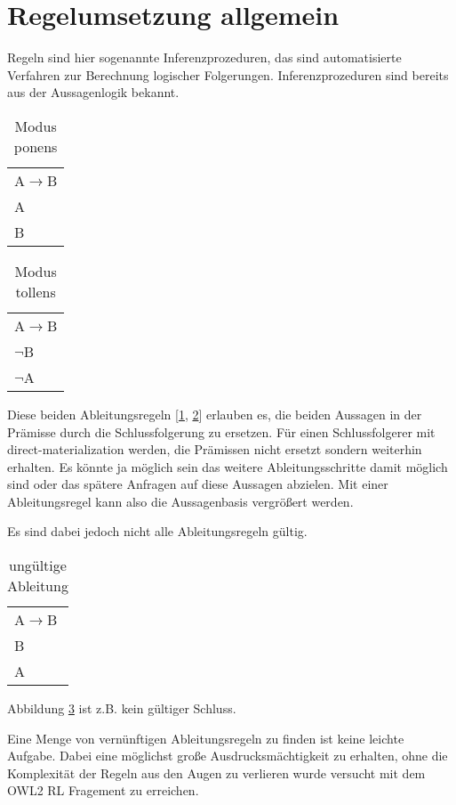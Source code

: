 \section{Regelumsetzung allgemein}
\label{abschnitt-regelumsetzung}
Regeln sind hier sogenannte Inferenzprozeduren, das sind automatisierte Verfahren zur Berechnung logischer Folgerungen. Inferenzprozeduren sind bereits aus der Aussagenlogik bekannt.

\begin{table}[htb]
\begin{center}
	\begin{tabular}{l}
	A$\rightarrow$B \\
	A \\
	\hline
	B
	\end{tabular}
\end{center}
	\caption{Modus ponens}
	\label{table-modus-ponens}
\end{table}

\begin{table}[htb]
\begin{center}
	\begin{tabular}{l}
	A$\rightarrow$B \\
	$\neg$B \\
	\hline
	$\neg$A
	\end{tabular}
\end{center}
	\caption{Modus tollens}
	\label{table-modus-tollens}
\end{table}

Diese beiden Ableitungsregeln [\ref{table-modus-ponens}, \ref{table-modus-tollens}] erlauben es, die beiden Aussagen in der Prämisse durch die Schlussfolgerung zu ersetzen. Für einen Schlussfolgerer mit direct-materialization werden, die Prämissen nicht ersetzt sondern weiterhin erhalten. Es könnte ja möglich sein das weitere Ableitungsschritte damit möglich sind oder das spätere Anfragen auf diese Aussagen abzielen. Mit einer Ableitungsregel kann also die Aussagenbasis vergrößert werden.

Es sind dabei jedoch nicht alle Ableitungsregeln gültig.
\begin{table}[htb]
\begin{center}
	\begin{tabular}{l}
	A$\rightarrow$B \\
	B \\
	\hline
	A
	\end{tabular}
\end{center}
	\caption{ungültige Ableitung}
	\label{table-invalid-inferred}
\end{table}
Abbildung \ref{table-invalid-inferred} ist z.B. kein gültiger Schluss.

Eine Menge von vernünftigen Ableitungsregeln zu finden ist keine leichte Aufgabe. Dabei eine möglichst große Ausdrucksmächtigkeit zu erhalten, ohne die Komplexität der Regeln aus den Augen zu verlieren wurde versucht mit dem OWL2 RL Fragement zu erreichen.




